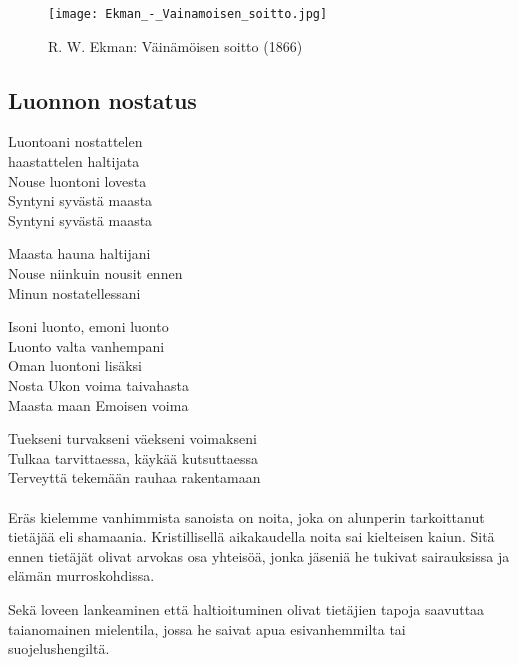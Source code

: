 
\begin{figure}[!ht]
  \caption{R. W. Ekman: Väinämöisen soitto (1866)}
  \centering
  \texttt{[image: Ekman\_-\_Vainamoisen\_soitto.jpg]}
\end{figure}  

\clearpage
\subsection{Luonnon nostatus}
  \begin{large}
    \begin{center}
      Luontoani nostattelen \\
      haastattelen haltijata \\
      Nouse luontoni lovesta \\
      Syntyni syvästä maasta \\
      Syntyni syvästä maasta \\
    \end{center}
    \begin{center}
      Maasta hauna haltijani \\
      Nouse niinkuin nousit ennen \\
      Minun nostatellessani \\
    \end{center}
    \begin{center}
      Isoni luonto, emoni luonto \\
      Luonto valta vanhempani \\
      Oman luontoni lisäksi \\
      Nosta Ukon voima taivahasta \\
      Maasta maan Emoisen voima \\
    \end{center}
    \begin{center}
      Tuekseni turvakseni väekseni voimakseni \\
      Tulkaa tarvittaessa, käykää kutsuttaessa \\
      Terveyttä tekemään rauhaa rakentamaan \\  
    \end{center}
  \end{large}

  \paragraph{}
  \begin{em}    
    Eräs kielemme vanhimmista sanoista on noita, joka on alunperin tarkoittanut tietäjää eli 
    shamaania. Kristillisellä aikakaudella noita sai kielteisen kaiun. Sitä ennen tietäjät 
    olivat arvokas osa yhteisöä, jonka jäseniä he tukivat sairauksissa ja elämän murroskohdissa.       
      
    Sekä loveen lankeaminen että haltioituminen olivat tietäjien tapoja saavuttaa taianomainen 
    mielentila, jossa he saivat apua esivanhemmilta tai suojelushengiltä.    
  \end{em}
 
